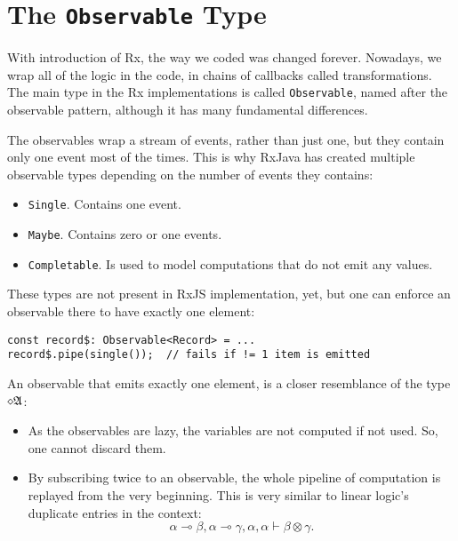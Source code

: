 \section{The \texttt{Observable} Type}

With introduction of Rx, the way we coded was changed forever. Nowadays, we wrap all of the logic in the code, in chains of callbacks called transformations. The main type in the Rx implementations is called \texttt{Observable}, named after the observable pattern, although it has many fundamental differences.

The observables wrap a stream of events, rather than just one, but they contain only one event most of the times. This is why RxJava has created multiple observable types depending on the number of events they contains:
\begin{itemize}
    \item \texttt{Single}. Contains one event.
    \item \texttt{Maybe}. Contains zero or one events.
    \item \texttt{Completable}. Is used to model computations that do not emit any values.
\end{itemize}

These types are not present in RxJS implementation, yet, but one can enforce an observable there to have exactly one element:

\begin{verbatim}
const record$: Observable<Record> = ...
record$.pipe(single());  // fails if != 1 item is emitted
\end{verbatim}

An observable that emits exactly one element, is a closer resemblance of the type $\diamond\mathfrak{A}$:

\begin{itemize}
    \item As the observables are lazy, the variables are not computed if not used. So, one cannot discard them.
    \item By subscribing twice to an observable, the whole pipeline of computation is replayed from the very beginning. This is very similar to linear logic's duplicate entries in the context:
    \[
    \alpha \multimap \beta, \alpha \multimap \gamma, \alpha, \alpha \vdash \beta \otimes \gamma.
    \]
\end{itemize}